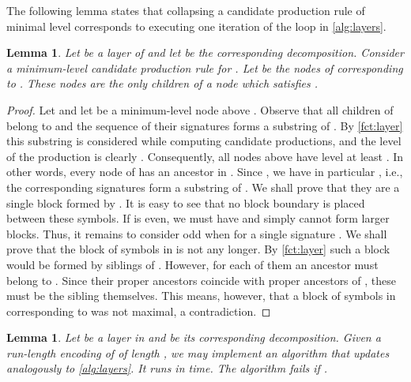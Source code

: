 \documentclass[a4paper]{article}
\newtheorem{lemma}[theorem]{Lemma}
\theoremstyle{remark}
\begin{document}
The following lemma states that collapsing a candidate production rule of minimal level corresponds to executing one iteration of the loop in \cref{alg:layers}.
\begin{lemma}\label{lem:cpr}
Let  be a layer of  and let  be the corresponding decomposition.
Consider a minimum-level candidate production rule  for .
Let  be the nodes of  corresponding to .
These nodes are the only children of a node  which satisfies .
\end{lemma}
\begin{proof}
Let  and let  be a minimum-level node above .
Observe that all children of  belong to  and the sequence of their signatures forms a substring of .
By \cref{fct:layer} this substring is considered while computing candidate productions, and the level of the production
is clearly .
Consequently, all nodes above  have level at least .
In other words, every node of  has an ancestor in .
Since , we have in particular ,
i.e., the corresponding signatures  form a substring of .
We shall prove that they are a single block formed by .
It is easy to see that no block boundary is placed between these symbols.
If  is even, we must have  and  simply cannot form larger blocks.
Thus, it remains to consider odd  when  for a single signature .
We shall prove that the block of symbols  in  is not any longer. By \cref{fct:layer}
such a block would be formed by siblings of . However, for each of them an ancestor must belong to .
Since their proper ancestors coincide with proper ancestors of , these must be the sibling themselves.
This means, however, that a block of symbols  in  corresponding to  was not maximal,
a contradiction.
\end{proof}

\begin{lemma}\label{lem:compressdec}
Let  be a layer in  and  be its corresponding decomposition.
Given a run-length encoding of  of length , we may implement an algorithm that updates  analogously to \cref{alg:layers}.
It runs in  time.
The algorithm fails if .
\end{lemma}
\end{document}
